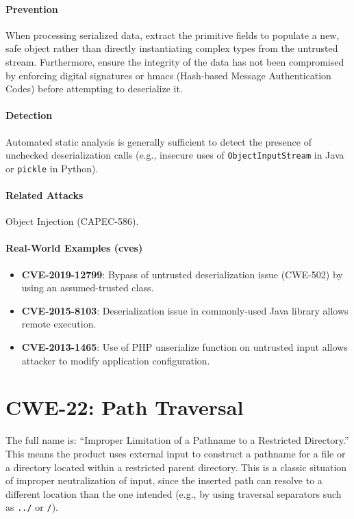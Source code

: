 \paragraph{Prevention} When processing serialized data, extract the primitive fields to populate a new, safe object rather than directly instantiating complex types from the untrusted stream. Furthermore, ensure the integrity of the data has not been compromised by enforcing digital signatures or \glspl{hmac} (Hash-based Message Authentication Codes) before attempting to deserialize it. 

\paragraph{Detection} Automated static analysis is generally sufficient to detect the presence of unchecked deserialization calls (e.g., insecure uses of \texttt{ObjectInputStream} in Java or \texttt{pickle} in Python).

\paragraph{Related Attacks} Object Injection (CAPEC-586).

\paragraph{Real-World Examples (\glspl{cve})}
\begin{itemize}
    \item \textbf{CVE-2019-12799}: Bypass of untrusted deserialization issue (CWE-502) by using an assumed-trusted class.
    \item \textbf{CVE-2015-8103}: Deserialization issue in commonly-used Java library allows remote execution.
    \item \textbf{CVE-2013-1465}: Use of PHP unserialize function on untrusted input allows attacker to modify application configuration.
\end{itemize}

\section{CWE-22: Path Traversal}
The full name is: ``Improper Limitation of a Pathname to a Restricted Directory.'' This means the product uses external input to construct a pathname for a file or a directory located within a restricted parent directory. This is a classic situation of improper neutralization of input, since the inserted path can resolve to a different location than the one intended (e.g., by using traversal separators such as \texttt{../} or \texttt{/}).

